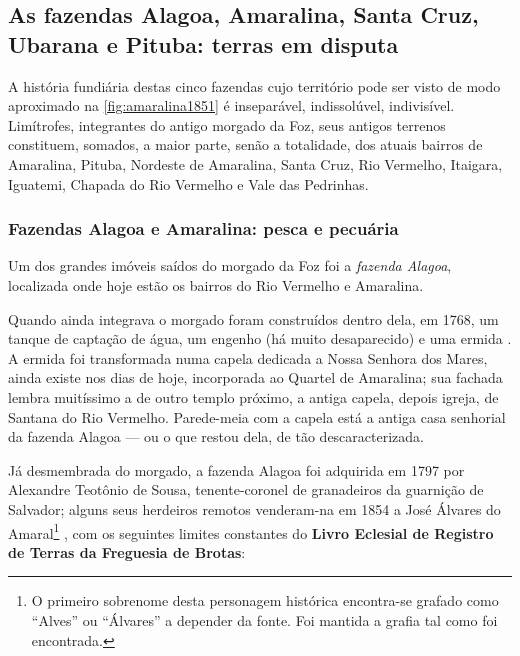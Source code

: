 \subsection{As fazendas Alagoa, Amaralina, Santa Cruz, Ubarana e Pituba: terras em disputa}\label{subsec:alagoaamaralina}

A história fundiária destas cinco fazendas cujo território pode ser visto de modo aproximado na \autoref{fig:amaralina1851} é inseparável, indissolúvel, indivisível. Limítrofes, integrantes do antigo morgado da Foz, seus antigos terrenos constituem, somados, a maior parte, senão a totalidade, dos atuais bairros de Amaralina, Pituba, Nordeste de Amaralina, Santa Cruz, Rio Vermelho, Itaigara, Iguatemi, Chapada do Rio Vermelho e Vale das Pedrinhas.

\subsubsection{Fazendas Alagoa e Amaralina: pesca e pecuária}

Um dos grandes imóveis saídos do morgado da Foz foi a \textit{fazenda Alagoa}, localizada onde hoje estão os bairros do Rio Vermelho e Amaralina.

Quando ainda integrava o morgado foram construídos dentro dela, em 1768, um tanque de captação de água, um engenho (há muito desaparecido) e uma ermida \cite[p.~118]{campos_alagoa_1942}. A ermida foi transformada numa capela dedicada a Nossa Senhora dos Mares, ainda existe nos dias de hoje, incorporada ao Quartel de Amaralina; sua fachada lembra muitíssimo a de outro templo próximo, a antiga capela, depois igreja, de Santana do Rio Vermelho. Parede-meia com a capela está a antiga casa senhorial da fazenda Alagoa --- ou o que restou dela, de tão descaracterizada.

Já desmembrada do morgado, a fazenda Alagoa foi adquirida em 1797 por Alexandre Teotônio de Sousa, tenente-coronel de granadeiros da guarnição de Salvador; alguns seus herdeiros remotos venderam-na em 1854 a José Álvares do Amaral\footnote{O primeiro sobrenome desta personagem histórica encontra-se grafado como ``Alves'' ou ``Álvares'' a depender da fonte. Foi mantida a grafia tal como foi encontrada.} \cite[p.~118]{campos_alagoa_1942}, com os seguintes limites constantes do \textbf{Livro Eclesial de Registro de Terras da Freguesia de Brotas}:

